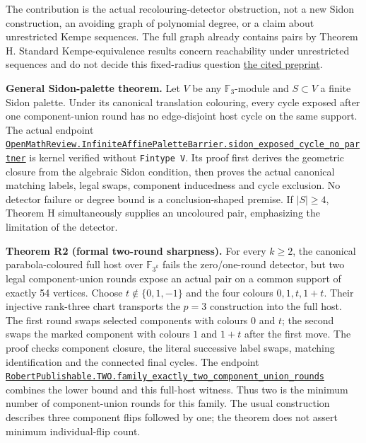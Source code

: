 \documentclass[smallextended]{svjour3}
\begin{document}
The contribution is the actual recolouring-detector obstruction, not a
new Sidon construction, an avoiding graph of polynomial degree, or a
claim about unrestricted Kempe sequences. The full graph already
contains pairs by Theorem H. Standard Kempe-equivalence results concern
reachability under unrestricted sequences and do not decide this
fixed-radius question \href{https://arxiv.org/abs/2105.01363}{the cited
preprint}.

\textbf{General Sidon-palette theorem.} Let \(V\) be any
\(\mathbb F_3\)-module and \(S\subset V\) a finite Sidon palette. Under
its canonical translation colouring, every cycle exposed after one
component-union round has no edge-disjoint host cycle on the same
support. The actual endpoint
\href{https://github.com/alejandrozu/openmath-2026-judging/blob/70c5ec3107658182f22c207d4c50f53f9cb3e602/robert-review-2026-10-07/lean/InfiniteAffinePaletteBarrier.lean\#L54}{\texttt{OpenMathReview.InfiniteAffinePaletteBarrier.sidon\_exposed\_cycle\_no\_partner}}
is kernel verified without \texttt{Fintype\ V}. Its proof first derives
the geometric closure from the algebraic Sidon condition, then proves
the actual canonical matching labels, legal swaps, component inducedness
and cycle exclusion. No detector failure or degree bound is a
conclusion-shaped premise. If \(|S|\geq4\), Theorem H simultaneously
supplies an uncoloured pair, emphasizing the limitation of the detector.

\textbf{Theorem R2 (formal two-round sharpness).} For every \(k\geq2\),
the canonical parabola-coloured full host over \(\mathbb F_{3^k}\) fails
the zero/one-round detector, but two legal component-union rounds expose
an actual pair on a common support of exactly 54 vertices. Choose
\(t\notin\{0,1,-1\}\) and the four colours \(0,1,t,1+t\). Their
injective rank-three chart transports the \(p=3\) construction into the
full host. The first round swaps selected components with colours \(0\)
and \(t\); the second swaps the marked component with colours \(1\) and
\(1+t\) after the first move. The proof checks component closure, the
literal successive label swaps, matching identification and the
connected final cycles. The endpoint
\href{https://github.com/alejandrozu/openmath-2026-judging/blob/70c5ec3107658182f22c207d4c50f53f9cb3e602/robert-review-2026-10-07/lean/CycleComposition.lean\#L171}{\texttt{RobertPublishable.TWO.family\_exactly\_two\_component\_union\_rounds}}
combines the lower bound and this full-host witness. Thus two is the
minimum number of component-union rounds for this family. The usual
construction describes three component flips followed by one; the
theorem does not assert minimum individual-flip count.
\end{document}
